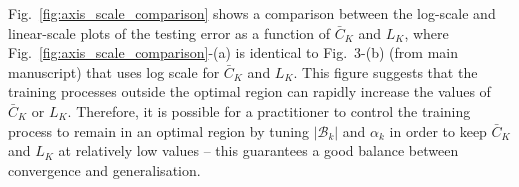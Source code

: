 \documentclass[10pt,journal,compsoc]{IEEEtran}
\begin{document}
Fig.~\ref{fig:axis_scale_comparison} shows a comparison between the log-scale and linear-scale plots of the testing error as a function of $\bar C_K$ and $L_K$, where Fig.~\ref{fig:axis_scale_comparison}-(a) is identical to Fig.~3-(b) (from main manuscript) that uses log scale for $\bar C_K$ and $L_K$.
This figure suggests that the training processes outside the optimal region can rapidly increase the values of $\bar C_K$ or $L_K$. %
Therefore, it is possible for a practitioner to control the training process to remain in an optimal region by tuning $|\mathcal{B}_k|$ and $\alpha_k$ in order to keep $\bar C_K$ and $L_K$ at relatively low values -- this guarantees a good balance between convergence and generalisation.
\begin{figure*}[b]
    \centering
    \caption{Testing error as a function of $\bar C_K$ and $L_K$ shown in (a) log scale and (b) linear scale, for ResNet on CIFAR-10 dataset. The optimum region is marked by the top-5 test accuracy.}
    \label{fig:axis_scale_comparison}
\end{figure*}
\end{document}
